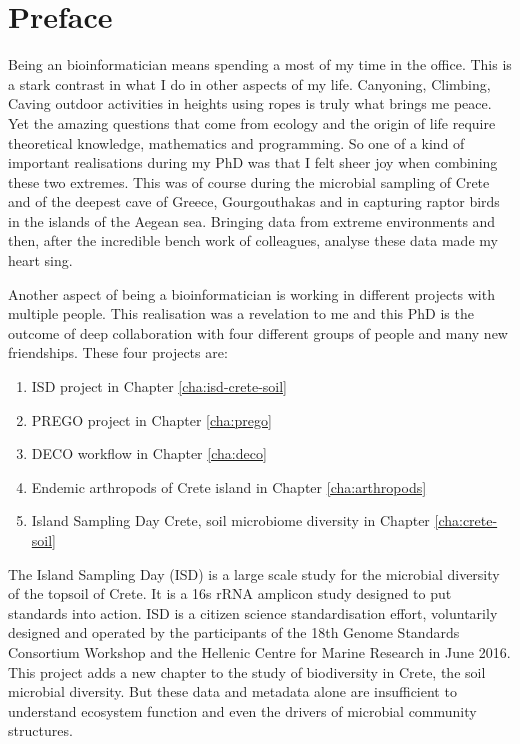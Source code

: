 \documentclass[
11pt, %
english, %
singlespacing, %
toctotoc, %
headsepline, %
]{MastersDoctoralThesis} %
\begin{document}

\chapter*{Preface}

Being an bioinformatician means spending a most of my time in the office. This is a 
stark contrast in what I do in other aspects of my life. Canyoning, Climbing, Caving 
outdoor activities in heights using ropes is truly what brings me peace. Yet the 
amazing questions that come from ecology and the origin of life require theoretical 
knowledge, mathematics and programming. So one of a kind of important realisations
during my PhD was that I felt sheer joy when combining these two extremes. This was
of course during the microbial sampling of Crete and of the deepest cave of Greece, Gourgouthakas
and in capturing raptor birds in the islands of the Aegean sea. Bringing data from 
extreme environments and then, after the incredible bench work of colleagues, analyse 
these data made my heart sing.

Another aspect of being a bioinformatician is working in different projects with 
multiple people. This realisation was a revelation to me and this PhD is the outcome 
of deep collaboration with four different groups of people and many new friendships. 
These four projects are:

\begin{enumerate}
    \item ISD project in Chapter \ref{cha:isd-crete-soil}
    \item PREGO project in Chapter \ref{cha:prego}
    \item DECO workflow in Chapter \ref{cha:deco}
    \item Endemic arthropods of Crete island in Chapter \ref{cha:arthropods}
    \item Island Sampling Day Crete, soil microbiome diversity in Chapter \ref{cha:crete-soil}
\end{enumerate}

The Island Sampling Day (ISD) is a large scale study for the microbial diversity of the
topsoil of Crete. It is a 16s rRNA amplicon study designed to put standards into action. 
ISD is a citizen science standardisation effort, voluntarily designed and
operated by the participants of the 18th Genome Standards Consortium
Workshop and the Hellenic Centre for Marine Research in June 2016.
This project adds a new chapter to the study of biodiversity in Crete,
the soil microbial diversity. But these data and metadata alone are 
insufficient to understand ecosystem function and even the drivers 
of microbial community structures.
\end{document}
